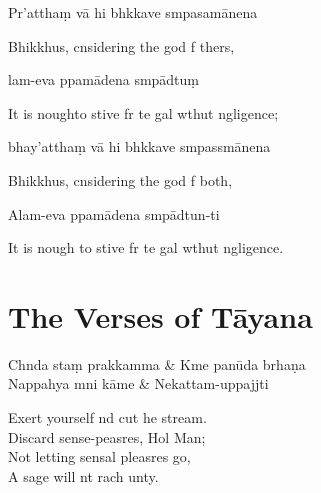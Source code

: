 Pr'atthaṃ vā hi bhkkave smpasamānena

\begin{english}
  Bhikkhus, cnsidering the god f thers,
\end{english}

lam-eva ppamādena smpādtuṃ

\begin{english}
  It is noughto stive fr te gal wthut ngligence;
\end{english}

bhay'atthaṃ vā hi bhkkave smpassmānena

\begin{english}
  Bhikkhus, cnsidering the god f both,
\end{english}

Alam-eva ppamādena smpādtun-ti

\begin{english}
  It is nough to stive fr te gal wthut ngligence.
\end{english}

\chapter{The Verses of Tāyana}%

\begin{leader}
\end{leader}

\begin{twochants}
  Chnda staṃ prakkamma & Kme panūda brhaṇa \\
  Nappahya mni kāme & Nekattam-uppajjti \\
\end{twochants}

\begin{english}
  Exert yourself nd cut he stream.\\
  Discard sense-peasres, Hol Man;\\
  Not letting sensal pleasres go,\\
  A sage will nt rach unty.
\end{english}

